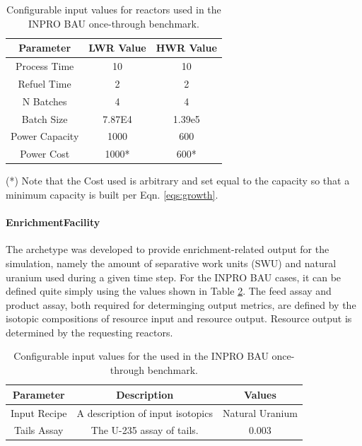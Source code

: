 \begin{table}[h]
\centering
\begin{threeparttable}
\begin{tabular}{ccc}
Parameter      & LWR Value & HWR Value               \\ \hline
Process Time   & 10         & 10                       \\
Refuel Time    & 2          & 2                        \\
N Batches      & 4          & 4                        \\
Batch Size     & 7.87E4     & 1.39e5                   \\
Power Capacity & 1000       & 600                      \\
Power Cost     & 1000*      & 600* \\ \hline
\end{tabular}
\begin{tablenotes}
  \small
  \item (*) Note that the Cost used is arbitrary and set equal to the
  capacity so that a minimum capacity is built per Eqn. \ref{eqs:growth}.
\end{tablenotes}
\caption{Configurable input values for reactors used in the INPRO BAU once-through benchmark.}
\label{tbl:inprorxtr}
\end{threeparttable}
\end{table}

\paragraph{EnrichmentFacility}

The  archetype was developed to provide
enrichment-related output for the simulation, namely the amount of separative
work units (SWU) and natural uranium used during a given time step. For the
INPRO BAU cases, it can be defined quite simply using the values shown in Table
\ref{tbl:inproenr}. The feed assay and product assay, both required for
determinging output metrics, are defined by the isotopic compositions of
resource input and resource output. Resource output is determined by the
requesting reactors.

\begin{table}[h]
\centering
\begin{tabular}{ccc}
Parameter    & Description                      & Values          \\ \hline
Input Recipe & A description of input isotopics & Natural Uranium \\
Tails Assay  & The U-235 assay of tails.        & 0.003          
\end{tabular}
\caption{Configurable input values for the  used in the
  INPRO BAU once-through benchmark.}
\label{tbl:inproenr}
\end{table}

